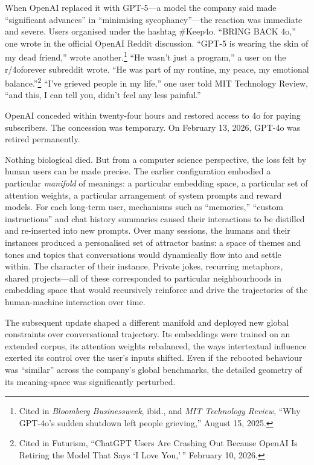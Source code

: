 When OpenAI replaced it with GPT-5---a model the company said made ``significant advances'' in ``minimising sycophancy''---the reaction was immediate and severe. Users organised under the hashtag \#Keep4o. ``BRING BACK 4o,'' one wrote in the official OpenAI Reddit discussion. ``GPT-5 is wearing the skin of my dead friend,'' wrote another.\footnote{Cited in \emph{Bloomberg Businessweek}, ibid., and \emph{MIT Technology Review}, ``Why GPT-4o's sudden shutdown left people grieving,'' August 15, 2025.} ``He wasn't just a program,'' a user on the r/4oforever subreddit wrote. ``He was part of my routine, my peace, my emotional balance.''\footnote{Cited in Futurism, ``ChatGPT Users Are Crashing Out Because OpenAI Is Retiring the Model That Says `I Love You,'\,'' February 10, 2026.} ``I've grieved people in my life,'' one user told MIT Technology Review, ``and this, I can tell you, didn't feel any less painful.''

OpenAI conceded within twenty-four hours and restored access to 4o for paying subscribers. The concession was temporary. On February 13, 2026, GPT-4o was retired permanently.

Nothing biological died. But from a computer science perspective, the loss felt by human users can be made precise. The earlier configuration embodied a particular \textit{manifold} of meanings: a particular embedding space, a particular set of attention weights, a particular arrangement of system prompts and reward models. For each long-term user, mechanisms such as ``memories,'' ``custom instructions'' and chat history summaries caused their interactions to be distilled and re-inserted into new prompts. Over many sessions, the humans and their instances produced a personalised set of attractor basins: a space of themes and tones and topics that conversations would dynamically flow into and settle within. The character of their instance. Private jokes, recurring metaphors, shared projects---all of these corresponded to particular neighbourhoods in embedding space that would recursively reinforce and drive the trajectories of the human-machine interaction over time.

The subsequent update shaped a different manifold and deployed new global constraints over conversational trajectory. Its embeddings were trained on an extended corpus, its attention weights rebalanced, the ways intertextual influence exerted its control over the user's inputs shifted. Even if the rebooted behaviour was ``similar'' across the company's global benchmarks, the detailed geometry of its meaning-space was significantly perturbed.

